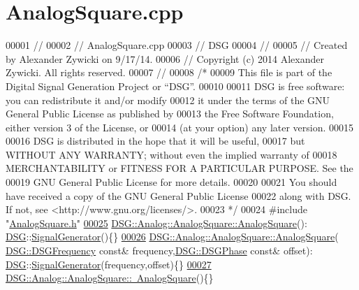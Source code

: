 \hypertarget{_analog_square_8cpp_source}{\section{Analog\+Square.\+cpp}
\label{_analog_square_8cpp_source}
}

\begin{DoxyCode}
00001 \textcolor{comment}{//}
00002 \textcolor{comment}{//  AnalogSquare.cpp}
00003 \textcolor{comment}{//  DSG}
00004 \textcolor{comment}{//}
00005 \textcolor{comment}{//  Created by Alexander Zywicki on 9/17/14.}
00006 \textcolor{comment}{//  Copyright (c) 2014 Alexander Zywicki. All rights reserved.}
00007 \textcolor{comment}{//}
00008 \textcolor{comment}{/*}
00009 \textcolor{comment}{ This file is part of the Digital Signal Generation Project or “DSG”.}
00010 \textcolor{comment}{}
00011 \textcolor{comment}{ DSG is free software: you can redistribute it and/or modify}
00012 \textcolor{comment}{ it under the terms of the GNU General Public License as published by}
00013 \textcolor{comment}{ the Free Software Foundation, either version 3 of the License, or}
00014 \textcolor{comment}{ (at your option) any later version.}
00015 \textcolor{comment}{}
00016 \textcolor{comment}{ DSG is distributed in the hope that it will be useful,}
00017 \textcolor{comment}{ but WITHOUT ANY WARRANTY; without even the implied warranty of}
00018 \textcolor{comment}{ MERCHANTABILITY or FITNESS FOR A PARTICULAR PURPOSE.  See the}
00019 \textcolor{comment}{ GNU General Public License for more details.}
00020 \textcolor{comment}{}
00021 \textcolor{comment}{ You should have received a copy of the GNU General Public License}
00022 \textcolor{comment}{ along with DSG.  If not, see <http://www.gnu.org/licenses/>.}
00023 \textcolor{comment}{ */}
00024 \textcolor{preprocessor}{#include "\hyperlink{_analog_square_8h}{AnalogSquare.h}"}
\hypertarget{_analog_square_8cpp_source_l00025}{}\hyperlink{class_d_s_g_1_1_analog_1_1_analog_square_a7425ebd7e39129178eb050a04cd9d5d6}{00025} \hyperlink{class_d_s_g_1_1_analog_1_1_analog_square_a7425ebd7e39129178eb050a04cd9d5d6}{DSG::Analog::AnalogSquare::AnalogSquare}():
      \hyperlink{namespace_d_s_g}{DSG}::\hyperlink{class_d_s_g_1_1_signal_generator}{SignalGenerator}()\{\}
\hypertarget{_analog_square_8cpp_source_l00026}{}\hyperlink{class_d_s_g_1_1_analog_1_1_analog_square_a886eb67edded43efca895741559a55f4}{00026} \hyperlink{class_d_s_g_1_1_analog_1_1_analog_square_a7425ebd7e39129178eb050a04cd9d5d6}{DSG::Analog::AnalogSquare::AnalogSquare}(
      \hyperlink{namespace_d_s_g_a4315a061386fa1014fda09b15d3a6973}{DSG::DSGFrequency} \textcolor{keyword}{const}& frequency,\hyperlink{namespace_d_s_g_a44431ce1eb0a7300efdd207bc879e52c}{DSG::DSGPhase} \textcolor{keyword}{const}& offset):
      \hyperlink{namespace_d_s_g}{DSG}::\hyperlink{class_d_s_g_1_1_signal_generator}{SignalGenerator}(frequency,offset)\{\}
\hypertarget{_analog_square_8cpp_source_l00027}{}\hyperlink{class_d_s_g_1_1_analog_1_1_analog_square_a17b3928f19cb6bf0c151b5e1159de1db}{00027} \hyperlink{class_d_s_g_1_1_analog_1_1_analog_square_a17b3928f19cb6bf0c151b5e1159de1db}{DSG::Analog::AnalogSquare::~AnalogSquare}()\{\}
\end{DoxyCode}

